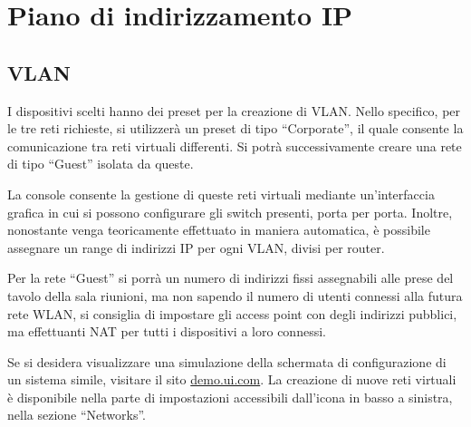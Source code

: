
\chapter{Piano di indirizzamento IP}

\section{VLAN}
I dispositivi scelti hanno dei preset per la creazione di VLAN. Nello specifico, per le tre reti
richieste, si utilizzerà un preset di tipo ``Corporate'', il quale consente la comunicazione tra
reti virtuali differenti. Si potrà successivamente creare una rete di tipo ``Guest'' isolata da queste.

La console consente la gestione di queste reti virtuali mediante un'interfaccia grafica in cui si
possono configurare gli switch presenti, porta per porta. Inoltre, nonostante venga teoricamente effettuato in maniera
automatica, è possibile assegnare un range di indirizzi IP per ogni VLAN, divisi per router.

Per la rete ``Guest'' si porrà un numero di indirizzi fissi assegnabili alle prese del tavolo
della sala riunioni, ma non sapendo il numero di utenti connessi alla futura rete WLAN, si consiglia di
impostare gli access point con degli indirizzi pubblici, ma effettuanti NAT per tutti i dispositivi a loro connessi.

Se si desidera visualizzare una simulazione della schermata di configurazione di un sistema simile,
visitare il sito \url{demo.ui.com}. La creazione di nuove reti virtuali è disponibile nella parte di
impostazioni accessibili dall'icona in basso a sinistra, nella sezione ``Networks''.


